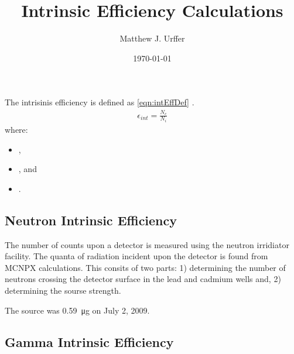 \documentclass[draftcls,onecolumn]{IEEEtran}
\begin{document}
\title{Intrinsic Efficiency Calculations}
\author{Matthew J. Urffer}
\date{\today}
\maketitle

\printnomenclature
\printindex

\listoftodos
\tableofcontents
\listoffigures
\listoftables
\lstlistoflistings

The intrisinis efficiency is defined as \eqref{eqn:intEffDef} \cite{knoll_radiation_2009}.
\begin{align}
  \epsilon_{int} = \frac{N_c}{N_i}
\end{align}
where:
\begin{itemize}
  \item[] ,
  \item[] , and
  \item[] .
\end{itemize}


\subsection{Neutron Intrinsic Efficiency}
The number of counts upon a detector is measured using the neutron irridiator facility.
The quanta of radiation incident upon the detector is found from MCNPX calculations.
This consits of two parts: 1) determining the number of neutrons crossing the detector surface in the lead and cadmium wells and, 2) determining the sourse strength.

The  source was \SI{0.59}{\ug} on July 2, 2009.


\subsection{Gamma Intrinsic Efficiency}


\end{document}
